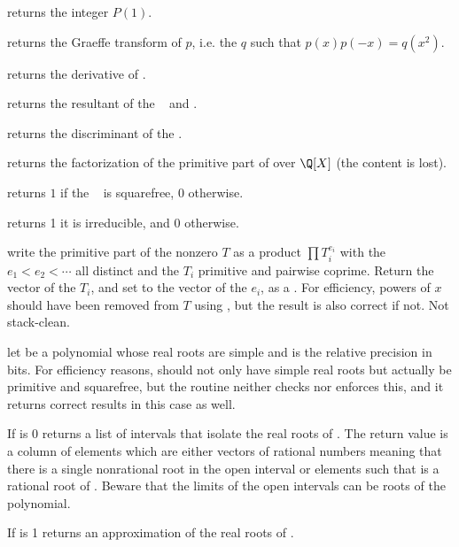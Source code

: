  returns the integer $P(1)$.

 returns the Graeffe transform of $p$, i.e. the
 $q$ such that $p(x)p(-x) = q(x^2)$.

 returns the derivative of .

 returns the resultant of the
~ and .

 returns the discriminant of the 
.

 returns the factorization of the primitive part
of  over $\Q[X]$ (the content is lost).

 returns $1$ if the
~ is squarefree, $0$ otherwise.

 returns 1 it  is irreducible, and
0 otherwise.

 write the primitive part of the
nonzero  $T$ as a product $\prod T_i^{e_i}$ with the $e_1 < e_2 <
\cdots$ all distinct and the $T_i$ primitive and pairwise coprime. Return the
vector of the $T_i$, and set  to the vector of the $e_i$, as a
. For efficiency, powers of $x$ should have been removed from
$T$ using , but the result is also correct if not. Not
stack-clean.

 let  be a
 polynomial whose real roots are simple and  is the
relative precision in bits. For efficiency reasons,  should not only
have simple real roots but actually be primitive and squarefree, but the
routine neither checks nor enforces this, and it returns correct results in
this case as well.

\item If  is 0 returns a list of intervals that isolate the real
roots of . The return value is a column of elements which are either
vectors \kbd{[a,b]} of rational numbers meaning that there is a single
nonrational root in the open interval  or elements  such
that  is a rational root of . Beware that the limits of the
open intervals can be roots of the polynomial.

\item If  is 1 returns an approximation of the real roots of .

